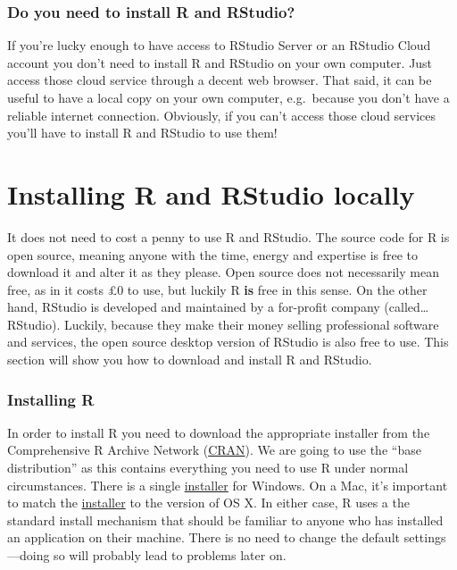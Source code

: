 \documentclass[
]{book}
\newenvironment{greybox}{
  \definecolor{shadecolor}{rgb}{0.95,0.95,0.95}  %
  \color{black}
  \begin{shaded}}
 {\end{shaded}}
\newenvironment{infobox}[1]
  {
  \begin{itemize}
  \renewcommand{\labelitemi}{
    \raisebox{-.7\height}[0pt][0pt]{
      {\setkeys{Gin}{width=3em,keepaspectratio}
        \texttt{[image: images/\#1]}}
    }
  }
  \setlength{\fboxsep}{1em}
  \begin{greybox}
  \item
  }
  {
  \end{greybox}
  \end{itemize}
  }
\begin{document}
\begin{infobox}{information}

\hypertarget{do-you-need-to-install-r-and-rstudio}{%
\subsubsection*{Do you need to install R and RStudio?}\label{do-you-need-to-install-r-and-rstudio}}

If you're lucky enough to have access to RStudio Server or an RStudio Cloud account you don't need to install R and RStudio on your own computer. Just access those cloud service through a decent web browser. That said, it can be useful to have a local copy on your own computer, e.g.~because you don't have a reliable internet connection. Obviously, if you can't access those cloud services you'll have to install R and RStudio to use them!

\end{infobox}

\hypertarget{installing-r-and-rstudio-locally}{%
\section*{Installing R and RStudio locally}\label{installing-r-and-rstudio-locally}}

It does not need to cost a penny to use R and RStudio. The source code for R is open source, meaning anyone with the time, energy and expertise is free to download it and alter it as they please. Open source does not necessarily mean free, as in it costs £0 to use, but luckily R \textbf{is} free in this sense. On the other hand, RStudio is developed and maintained by a for-profit company (called\ldots{} RStudio). Luckily, because they make their money selling professional software and services, the open source desktop version of RStudio is also free to use. This section will show you how to download and install R and RStudio.

\hypertarget{installing-r}{%
\subsubsection*{Installing R}\label{installing-r}}

In order to install R you need to download the appropriate installer from the Comprehensive R Archive Network (\href{http://cran.r-project.org}{CRAN}). We are going to use the ``base distribution'' as this contains everything you need to use R under normal circumstances. There is a single \href{http://cran.r-project.org/bin/windows/base/}{installer} for Windows. On a Mac, it's important to match the \href{http://cran.r-project.org/bin/macosx/}{installer} to the version of OS X. In either case, R uses a the standard install mechanism that should be familiar to anyone who has installed an application on their machine. There is no need to change the default settings---doing so will probably lead to problems later on.
\end{document}

